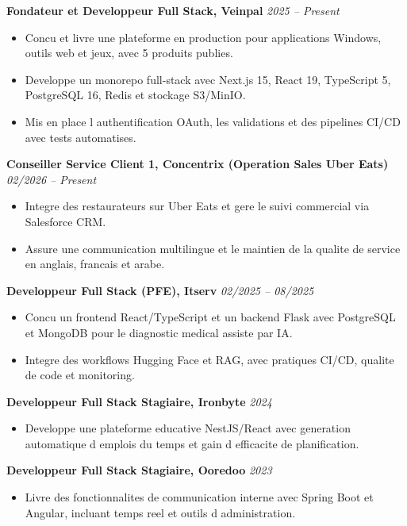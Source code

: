 \documentclass[10pt,a4paper]{article}
\begin{document}
\textbf{Fondateur et Developpeur Full Stack, Veinpal} \hfill \textit{2025 -- Present}
\begin{itemize}
  \item Concu et livre une plateforme en production pour applications Windows, outils web et jeux, avec 5 produits publies.
  \item Developpe un monorepo full-stack avec Next.js 15, React 19, TypeScript 5, PostgreSQL 16, Redis et stockage S3/MinIO.
  \item Mis en place l authentification OAuth, les validations et des pipelines CI/CD avec tests automatises.
\end{itemize}

\textbf{Conseiller Service Client 1, Concentrix (Operation Sales Uber Eats)} \hfill \textit{02/2026 -- Present}
\begin{itemize}
  \item Integre des restaurateurs sur Uber Eats et gere le suivi commercial via Salesforce CRM.
  \item Assure une communication multilingue et le maintien de la qualite de service en anglais, francais et arabe.
\end{itemize}

\textbf{Developpeur Full Stack (PFE), Itserv} \hfill \textit{02/2025 -- 08/2025}
\begin{itemize}
  \item Concu un frontend React/TypeScript et un backend Flask avec PostgreSQL et MongoDB pour le diagnostic medical assiste par IA.
  \item Integre des workflows Hugging Face et RAG, avec pratiques CI/CD, qualite de code et monitoring.
\end{itemize}

\textbf{Developpeur Full Stack Stagiaire, Ironbyte} \hfill \textit{2024}
\begin{itemize}
  \item Developpe une plateforme educative NestJS/React avec generation automatique d emplois du temps et gain d efficacite de planification.
\end{itemize}

\textbf{Developpeur Full Stack Stagiaire, Ooredoo} \hfill \textit{2023}
\begin{itemize}
  \item Livre des fonctionnalites de communication interne avec Spring Boot et Angular, incluant temps reel et outils d administration.
\end{itemize}
\end{document}
